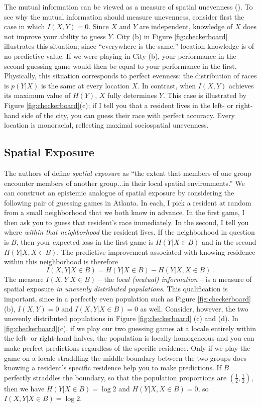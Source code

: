 \documentclass[english]{scrartcl}
\begin{document}
		The mutual information can be viewed as a measure of spatial unevenness (\cite{Roberto2015a}). To see why the mutual information should measure unevenness, consider first the case in which $I(X,Y) = 0$. Since $X$ and $Y$ are independent, knowledge of $X$ does not improve your ability to guess $Y$. City (b) in Figure \ref{fig:checkerboard} illustrates this situation; since ``everywhere is the same,'' location knowledge is of no predictive value. If we were playing in City (b), your performance in the second guessing game would then be equal to your performance in the first. Physically, this situation corresponds to perfect evenness: the distribution of races is $p(Y|X)$ is the same at every location $X$. In contrast, when $I(X,Y)$ achieves its maximum value of $H(Y)$, $X$ fully determines $Y$. This case is illustrated by Figure \ref{fig:checkerboard}(c); if I tell you that a resident lives in the left- or right-hand side of the city, you can guess their race with perfect accuracy. Every location is monoracial, reflecting maximal sociospatial unevenness. 
		
	\subsection{Spatial Exposure}

		The authors of \cite{Reardon2004} define \emph{spatial exposure} as ``the extent that members of one group encounter members of another group...in their local spatial environments.'' We can construct an epistemic analogue of spatial exposure by considering the following pair of guessing games in Atlanta. In each, I pick a resident at random from a small neighborhood that we both know in advance. In the first game, I then ask you to guess that resident's race immediately. In the second, I tell you where \emph{within that neighborhood} the resident lives. If the neighborhood in question is $B$, then your expected loss in the first game is $H(Y|X\in B)$ and in the second $H(Y|X, X\in B)$. The predictive improvement associated with knowing residence within this neighborhood is therefore
		\begin{equation*}
			I(X,Y | X \in B) = H(Y|X\in B) - H(Y|X, X\in B)\;.
		\end{equation*}
		The measure $I(X,Y|X \in B)$ -- the \emph{local (mutual) information} -- is a measure of spatial exposure \emph{in unevenly distributed populations}. This qualification is important, since in a perfectly even population such as Figure \ref{fig:checkerboard}(b),  $I(X,Y) = 0$ and $I(X,Y|X\in B) = 0$ as well. Consider, however, the two unevenly distributed populations in Figure \ref{fig:checkerboard} (c) and (d). In \ref{fig:checkerboard}(c), if we play our two guessing games at a locale entirely within the left- or right-hand halves, the population is locally homogeneous and you can make perfect predictions regardless of the specific residence. Only if we play the game on a locale straddling the middle boundary between the two groups does knowing a resident's specific residence help you to make predictions. If $B$ perfectly straddles the boundary, so that the population proportions are $(\frac{1}{2},\frac{1}{2})$, then we have $H(Y|X\in B) = \log 2$ and $H(Y|X,X\in B) = 0$, so $I(X,Y|X \in B) = \log 2$. 
\end{document}
